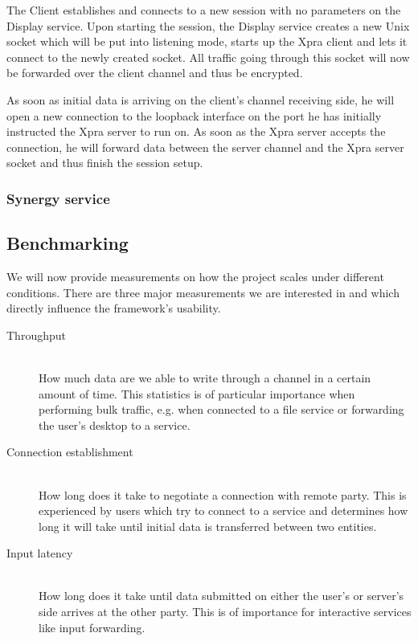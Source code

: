 The Client establishes and connects to a new session with no parameters on the Display service.
Upon starting the session, the Display service creates a new Unix socket which will be put into listening mode, starts up the Xpra client and lets it connect to the newly created socket.
All traffic going through this socket will now be forwarded over the client channel and thus be encrypted.

As soon as initial data is arriving on the client's channel receiving side, he will open a new connection to the loopback interface on the port he has initially instructed the Xpra server to run on.
As soon as the Xpra server accepts the connection, he will forward data between the server channel and the Xpra server socket and thus finish the session setup.

\subsubsection{Synergy service}
\label{sec:synergy-service}

\subsection{Benchmarking}
\label{sec:benchmarking}

We will now provide measurements on how the project scales under different conditions.
There are three major measurements we are interested in and which directly influence the framework's usability.
\begin{description}
    \item[Throughput]\hfill\\
        How much data are we able to write through a channel in a certain amount of time.
        This statistics is of particular importance when performing bulk traffic, e.g. when connected to a file service or forwarding the user's desktop to a service.
    \item[Connection establishment]\hfill\\
        How long does it take to negotiate a connection with remote party.
        This is experienced by users which try to connect to a service and determines how long it will take until initial data is transferred between two entities.
    \item[Input latency]\hfill\\
        How long does it take until data submitted on either the user's or server's side arrives at the other party.
        This is of importance for interactive services like input forwarding.
\end{description}

